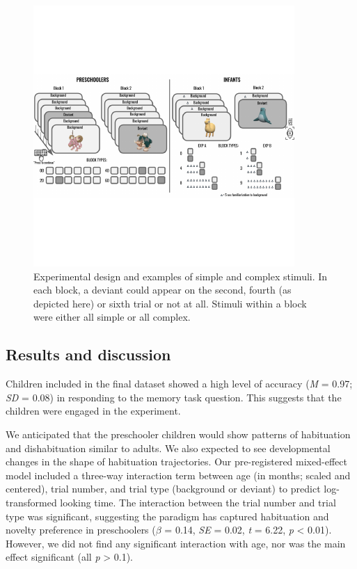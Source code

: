 \documentclass[10pt, letterpaper]{article}
\newenvironment{CodeChunk}{}{}
\begin{document}
\begin{CodeChunk}
\begin{figure}[h]

{\centering \includegraphics{figs/experimental_design-1} 

}

\caption[Experimental design and examples of simple and complex stimuli]{Experimental design and examples of simple and complex stimuli. In each block, a deviant could appear on the second, fourth (as depicted here) or sixth trial or not at all. Stimuli within a block were either all simple or all complex.}\label{fig:experimental_design}
\end{figure}
\end{CodeChunk}

\hypertarget{results-and-discussion}{%
\subsection{Results and discussion}\label{results-and-discussion}}

Children included in the final dataset showed a high level of accuracy
(\emph{M} = 0.97; \emph{SD} = 0.08) in responding to the memory task
question. This suggests that the children were engaged in the
experiment.

We anticipated that the preschooler children would show patterns of
habituation and dishabituation similar to adults. We also expected to
see developmental changes in the shape of habituation trajectories. Our
pre-registered mixed-effect model included a three-way interaction term
between age (in months; scaled and centered), trial number, and trial
type (background or deviant) to predict log-transformed looking time.
The interaction between the trial number and trial type was significant,
suggesting the paradigm has captured habituation and novelty preference
in preschoolers (\(\beta\) = 0.14, \emph{SE} = 0.02, \emph{t} = 6.22,
\emph{p} \textless{} 0.01). However, we did not find any significant
interaction with age, nor was the main effect significant (all \emph{p}
\textgreater{} 0.1).
\end{document}
